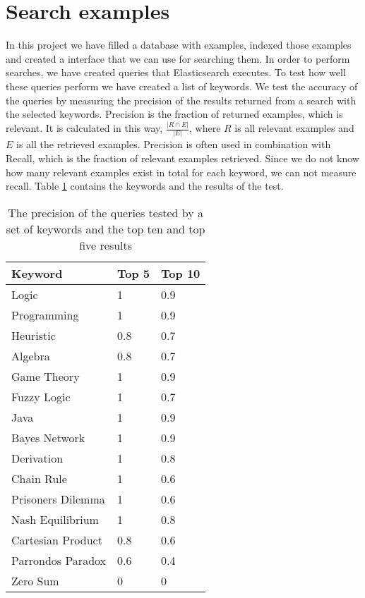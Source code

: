 
\section{Search examples} \label{search_experiment}
In this project we have filled a database with examples, indexed those examples and created a interface that we can use for searching them. In order to perform searches, we have created queries that Elasticsearch executes. To test how well these queries perform we have created a list of keywords. We test the accuracy of the queries by measuring the precision of the results returned from a search with the selected  keywords. Precision is the fraction of returned examples, which is relevant. It is calculated in this way, \(\frac{|R \cap E |}{|E|}\), where \(R\) is all relevant examples and \(E\) is all the retrieved examples. Precision is often used in combination with Recall, which is the fraction of relevant examples retrieved. Since we do not know how many relevant examples exist in total for each keyword, we can not measure recall. 
Table \ref{table:precision_test} contains the keywords and the results of the test.


\begin{table}[h!]
\centering
\begin{tabular} {|| p{15em} | p{5em} | p{5em} ||} 
 \hline
 Keyword & Top 5 & Top 10 \\ [0.5ex] 
 \hline

Logic & 1 & 0.9 \\
Programming & 1 & 0.9 \\
Heuristic & 0.8 & 0.7 \\
Algebra & 0.8 & 0.7 \\
Game Theory & 1 & 0.9 \\

Fuzzy Logic & 1 & 0.7 \\
Java & 1 & 0.9 \\
Bayes Network & 1 & 0.9 \\
Derivation & 1 & 0.8 \\

Chain Rule & 1 & 0.6 \\
Prisoners Dilemma & 1 & 0.6 \\
Nash Equilibrium & 1 & 0.8 \\
Cartesian Product & 0.8 & 0.6 \\
Parrondos Paradox & 0.6 & 0.4 \\
Zero Sum & 0 & 0 \\

 \hline
\end{tabular}
\caption{The precision of the queries tested by a set of keywords and the top ten and top five results}
\label{table:precision_test}
\end{table}

